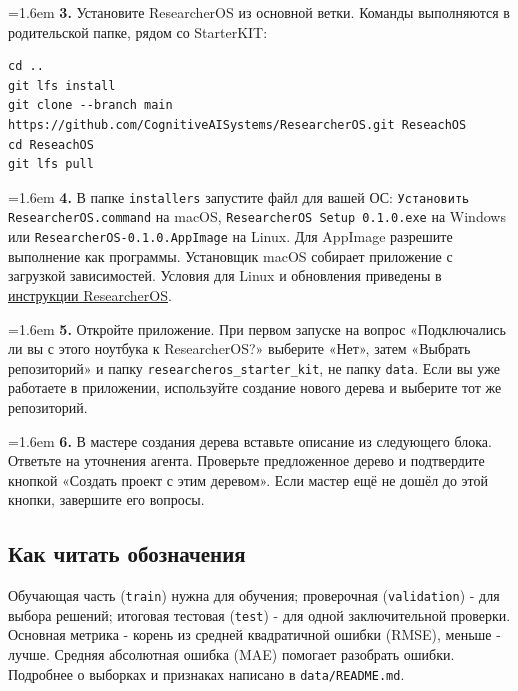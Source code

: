\documentclass[10pt,a4paper]{article}
\begin{document}
\par\noindent\hangindent=1.6em \textbf{3.} Установите ResearcherOS из основной ветки. Команды выполняются в родительской папке, рядом со StarterKIT:\par
\begin{promptbox}
\begin{Verbatim}
cd ..
git lfs install
git clone --branch main https://github.com/CognitiveAISystems/ResearcherOS.git ReseachOS
cd ReseachOS
git lfs pull
\end{Verbatim}
\end{promptbox}
\par\noindent\hangindent=1.6em \textbf{4.} В папке \texttt{installers} запустите файл для вашей ОС: \texttt{Установить ResearcherOS.command} на macOS, \texttt{ResearcherOS Setup 0.1.0.exe} на Windows или \texttt{ResearcherOS-\allowbreak{}0.1.0.AppImage} на Linux. Для AppImage разрешите выполнение как программы. Установщик macOS собирает приложение с загрузкой зависимостей. Условия для Linux и обновления приведены в \href{https://github.com/CognitiveAISystems/ResearcherOS\#readme}{инструкции ResearcherOS}.\par
\par\noindent\hangindent=1.6em \textbf{5.} Откройте приложение. При первом запуске на вопрос «Подключались ли вы с этого ноутбука к ResearcherOS?» выберите «Нет», затем «Выбрать репозиторий» и папку \texttt{researcheros\_\allowbreak{}starter\_\allowbreak{}kit}, не папку \texttt{data}. Если вы уже работаете в приложении, используйте создание нового дерева и выберите тот же репозиторий.\par
\par\noindent\hangindent=1.6em \textbf{6.} В мастере создания дерева вставьте описание из следующего блока. Ответьте на уточнения агента. Проверьте предложенное дерево и подтвердите кнопкой «Создать проект с этим деревом». Если мастер ещё не дошёл до этой кнопки, завершите его вопросы.\par
\subsection*{Как читать обозначения}
Обучающая часть (\texttt{train}) нужна для обучения; проверочная (\texttt{validation}) - для выбора решений; итоговая тестовая (\texttt{test}) - для одной заключительной проверки. Основная метрика - корень из средней квадратичной ошибки (RMSE), меньше - лучше. Средняя абсолютная ошибка (MAE) помогает разобрать ошибки. Подробнее о выборках и признаках написано в \texttt{data/README.md}.
\end{document}
